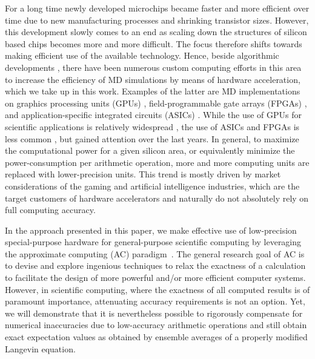 \documentclass[format=acmsmall,authorversion,nonacm,timestamp,urlbreakonhyphens]{acmart}
\begin{document}
For a long time newly developed microchips became faster and more efficient over time due to new manufacturing processes and shrinking transistor sizes. However, this development slowly comes to an end as scaling down the structures of silicon based chips becomes more and more difficult. The focus therefore shifts towards making efficient use of the available technology. Hence, beside algorithmic developments \cite{MTS, Snir, GSE, Shaw, VerletCell, pSHAKE, John, Prodan}, there have been numerous custom computing efforts in this area to increase the efficiency of MD simulations by means of hardware acceleration, which we take up in this work. Examples of the latter are MD implementations on graphics processing units (GPUs) \cite{HOOMD, NAMD, OpenMM, HalMD, Lammps, Amber, Gromacs}, field-programmable gate arrays (FPGAs) \cite{HerbordtI, HerbordtII}, and application-specific integrated circuits (ASICs) \cite{AntonI, AntonII}.
While the use of GPUs for scientific applications is relatively widespread \cite{GPUcomp,Binder,Weigel}, the use of ASICs \cite{QCDScience, QCDOC, GrapeScience, Grape} and FPGAs is less common \cite{JanusI, JanusII, Convey, FDTD, Kenter, Galerkin}, but gained attention over the last years.
In general, to maximize the computational power for a given silicon area, or equivalently minimize the power-consumption per arithmetic operation, more and more computing units are replaced with lower-precision units. This trend is mostly driven by market considerations of the gaming and artificial intelligence industries, which are the target customers of hardware accelerators and naturally do not absolutely rely on full computing accuracy.

In the approach presented in this paper, we make effective use of low-precision special-purpose hardware for general-purpose scientific computing by leveraging the approximate computing (AC) paradigm~\cite{KlavikMalossiBekasEtAl2014, PlesslAC}. The general research goal of AC is to devise and explore ingenious techniques to relax the exactness of a calculation to facilitate the design of more powerful and/or more efficient computer systems. However, in scientific computing, where the exactness of all computed results is of paramount importance, attenuating accuracy requirements is not an option. Yet, we will demonstrate that it is nevertheless possible to rigorously compensate for numerical inaccuracies due to low-accuracy arithmetic operations and still obtain exact expectation values as obtained by ensemble averages of a properly modified Langevin equation.
\end{document}
